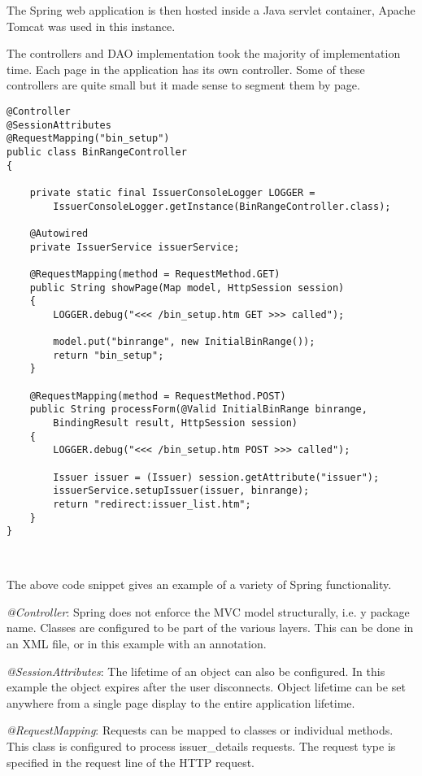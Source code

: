 \documentclass[a4paper, 11pt, titlepage]{article}
\begin{document}
The Spring web application is then hosted inside a Java servlet container, Apache Tomcat was used in this instance. 
 
The controllers and DAO implementation took the majority of implementation time. Each page in the application has its own controller. Some of these controllers are quite small but it made sense to segment them by page.  
 
\begin{verbatim} 
@Controller 
@SessionAttributes 
@RequestMapping("bin_setup") 
public class BinRangeController 
{ 
 
    private static final IssuerConsoleLogger LOGGER = 
        IssuerConsoleLogger.getInstance(BinRangeController.class); 
 
    @Autowired 
    private IssuerService issuerService; 
 
    @RequestMapping(method = RequestMethod.GET) 
    public String showPage(Map model, HttpSession session) 
    { 
        LOGGER.debug("<<< /bin_setup.htm GET >>> called"); 
 
        model.put("binrange", new InitialBinRange()); 
        return "bin_setup"; 
    } 
 
    @RequestMapping(method = RequestMethod.POST) 
    public String processForm(@Valid InitialBinRange binrange, 
        BindingResult result, HttpSession session) 
    { 
        LOGGER.debug("<<< /bin_setup.htm POST >>> called"); 
 
        Issuer issuer = (Issuer) session.getAttribute("issuer"); 
        issuerService.setupIssuer(issuer, binrange); 
        return "redirect:issuer_list.htm"; 
    } 
} 
 
 
\end{verbatim} 
 
The above code snippet gives an example of a variety of Spring functionality.  
 
\textit{@Controller}: Spring does not enforce the MVC model structurally, i.e. y package name. Classes are configured to be part of the various layers. This can be done in an XML file, or in this example with an annotation.  
 
\textit{@SessionAttributes}: The lifetime of an object can also be configured. In this example the object expires after the user disconnects. Object lifetime can be set anywhere from a single page display to the entire application lifetime. 
 
\textit{@RequestMapping}: Requests can be mapped to classes or individual methods. This class is configured to process issuer_details requests. The request type is specified in the request line of the HTTP request. 
 
\end{document}
